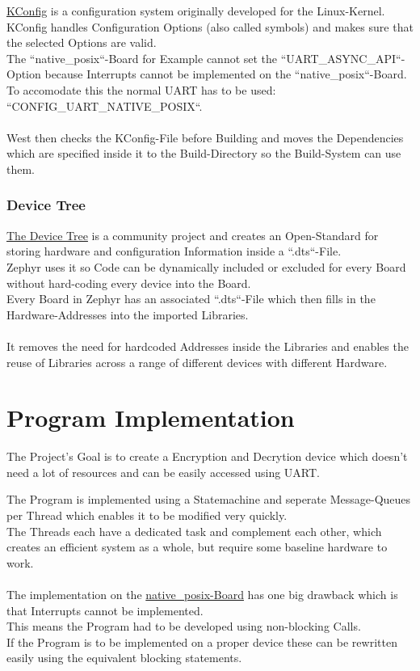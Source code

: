 \href{https://www.kernel.org/doc/html/latest/kbuild/kconfig.html}
{KConfig} is a configuration system originally developed for the Linux-Kernel.
KConfig handles Configuration Options (also called symbols) and makes sure that
the selected Options are valid.
\\
The ``native\_posix``-Board for Example cannot set the ``UART\_ASYNC\_API``-Option
because Interrupts cannot be implemented on the ``native\_posix``-Board.
\\
To accomodate this the normal UART has to be used:
\\
``CONFIG\_UART\_NATIVE\_POSIX``.
\\
\\
West then checks the KConfig-File before Building and moves the Dependencies which
are specified inside it to the Build-Directory so the Build-System can use them.

\subsubsection{Device Tree}

\href{https://www.devicetree.org/}
{The Device Tree} is a community project and creates an Open-Standard for storing
hardware and configuration Information inside a ``.dts``-File.
\\
Zephyr uses it so Code can be dynamically included or excluded for
every Board without hard-coding every device into the Board.
\\
Every Board in Zephyr has an associated ``.dts``-File which then fills in the
Hardware-Addresses into the imported Libraries.
\\
\\
It removes the need for hardcoded Addresses inside the Libraries and enables
the reuse of Libraries across a range of different devices with
different Hardware.

\pagebreak

\section{Program Implementation}

The Project's Goal is to create a Encryption and Decrytion device which
doesn't need a lot of resources and can be easily accessed using UART.

The Program is implemented using a Statemachine and seperate Message-Queues
per Thread which enables it to be modified very quickly.
\\
The Threads each have a dedicated task and complement each other, which creates
an efficient system as a whole, but require some baseline hardware to work.
\\
\\
The implementation on the
\href{https://docs.zephyrproject.org/2.0.0/boards/posix/native_posix/doc/index.html?highlight=native_posix}
{native\_posix-Board} has one big drawback which is that Interrupts cannot be
implemented.
\\
This means the Program had to be developed using non-blocking Calls.
\\
If the Program is to be implemented on a proper device these can be rewritten easily
using the equivalent blocking statements.

